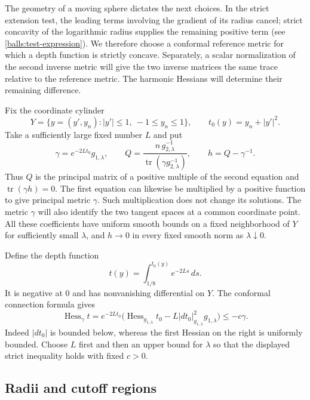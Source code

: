 \documentclass[11pt]{article}
\theoremstyle{definition}
\theoremstyle{remark}
\numberwithin{equation}{section}
\begin{document}
The geometry of a moving sphere dictates the next choices. In the
strict extension test, the leading terms involving the gradient of its
radius cancel; strict concavity of the logarithmic radius supplies the
remaining positive term (see \eqref{balls:test-expression}). We therefore
choose a conformal reference metric for which a depth function is
strictly concave. Separately, a scalar normalization of the second
inverse metric will give the two inverse matrices the same trace
relative to the reference metric. The harmonic Hessians will determine
their remaining difference.

Fix the coordinate cylinder
\[
 Y=\{y=(y',y_n): |y'|\leq1,\ -1\leq y_n\leq1\},
 \qquad t_0(y)=y_n+|y'|^2.
\]
Take a sufficiently large fixed number $L$ and put
\begin{equation}\label{balls:normalization}
 \gamma=e^{-2Lt_0}g_{1,\lambda},\qquad
 Q=\frac{n\,g_{2,\lambda}^{-1}}
          {\operatorname{tr}(\gamma g_{2,\lambda}^{-1})},\qquad
 h=Q-\gamma^{-1}.
\end{equation}
Thus $Q$ is the principal matrix of a positive multiple of the second
equation and $\operatorname{tr}(\gamma h)=0$.  The first equation can
likewise be multiplied by a positive function to give principal metric
$\gamma$.  Such multiplication does not change its solutions.  The
metric $\gamma$ will also identify the two tangent spaces at a common
coordinate point.  All these coefficients have uniform smooth bounds
on a fixed neighborhood of $Y$ for sufficiently small $\lambda$, and
$h\to0$ in every fixed smooth norm as $\lambda\downarrow0$.

Define the depth function
\begin{equation}\label{balls:depth}
 t(y)=\int_{1/8}^{t_0(y)}e^{-2Ls}\,ds.
\end{equation}
It is negative at $0$ and has nonvanishing differential on $Y$.  The
conformal connection formula gives
\begin{equation}\label{balls:depth-hessian}
 \operatorname{Hess}_{\gamma}t
 =e^{-2Lt_0}\bigl(
    \operatorname{Hess}_{g_{1,\lambda}}t_0
       -L|dt_0|_{g_{1,\lambda}}^2g_{1,\lambda}\bigr)
 \leq-c\gamma.
\end{equation}
Indeed $|dt_0|$ is bounded below, whereas the first Hessian on the right is
uniformly bounded.  Choose $L$ first and then an upper bound for
$\lambda$ so that the displayed strict inequality holds with fixed $c>0$.

\subsection{Radii and cutoff regions}
\end{document}
